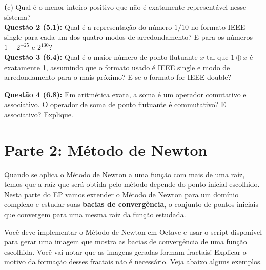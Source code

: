 \documentclass[12pt]{article}
\newcommand{\questao}[1] {\vspace{12pt} \noindent \large \textbf{Questão #1:} \normalsize}
\renewcommand{\part}[1] {\noindent\textbf (#1)}
\begin{document}
\part{c} Qual é o menor inteiro positivo que não é exatamente 
representável nesse sistema? \\

\questao{2 (5.1)}
Qual é a representação do número $1/10$ no formato IEEE single para
cada um dos quatro modos de arredondamento? E para os números 
$1 + 2^{-25}$ e $2^{130}$?\\

\questao{3 (6.4)}
Qual é o maior número de ponto flutuante $x$ tal que $1 \oplus x$ é
exatamente 1, assumindo que o formato usado é IEEE single e modo de 
arredondamento para o mais próximo? E se o formato for IEEE double?

\questao{4 (6.8)} Em aritmética exata, a soma é um operador
comutativo e associativo. O operador de soma de ponto flutuante é 
commutativo? E associativo? Explique.

\section{Parte 2: Método de Newton}
Quando se aplica o Método de Newton a uma função com mais de uma raíz,
temos que a raíz que será obtida pelo método depende do ponto inicial 
escolhido. Nesta parte do EP vamos extender o Método de Newton para um
domínio complexo e estudar suas \textbf{bacias de convergência}, o 
conjunto de pontos iniciais que convergem para uma mesma raíz da função
estudada.

Você deve implementar o Método de Newton em Octave e usar o script 
disponível para gerar uma imagem que mostra as
bacias de convergência de uma função escolhida. Você vai notar que as
imagens geradas formam fractais! Explicar o motivo da formação desses
fractais não é necessário. Veja abaixo alguns exemplos.
\end{document}
